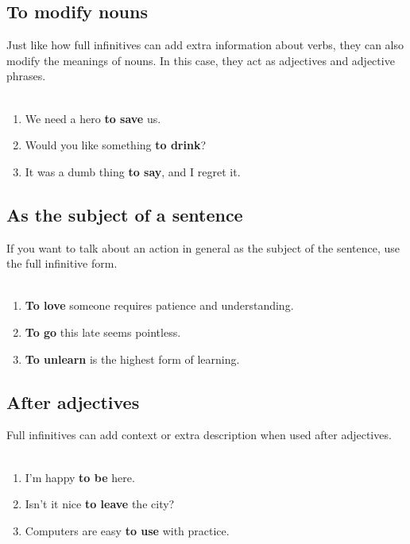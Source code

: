 \subsection{To modify nouns}
Just like how full infinitives can add extra information about verbs, 
they can also modify the meanings of nouns. In this case, 
they act as adjectives and adjective phrases. \\\\
\begin{enumerate}
    \item[] We need a hero \textbf{to save} us. 
    \item[] Would you like something \textbf{to drink}? 
    \item[] It was a dumb thing \textbf{to say}, and I regret it. 
\end{enumerate}




\subsection{As the subject of a sentence}
If you want to talk about an action in general as the subject of the sentence, 
use the full infinitive form. \\\\
\begin{enumerate}
    \item[] \textbf{To love} someone requires patience and understanding. 
    \item[] \textbf{To go} this late seems pointless. 
    \item[] \textbf{To unlearn} is the highest form of learning. 
\end{enumerate}





\subsection{After adjectives}
Full infinitives can add context or extra description when used after adjectives. \\\\
\begin{enumerate}
    \item[] I’m happy \textbf{to be} here. 
    \item[] Isn’t it nice \textbf{to leave} the city? 
    \item[] Computers are easy \textbf{to use} with practice. 
\end{enumerate}






